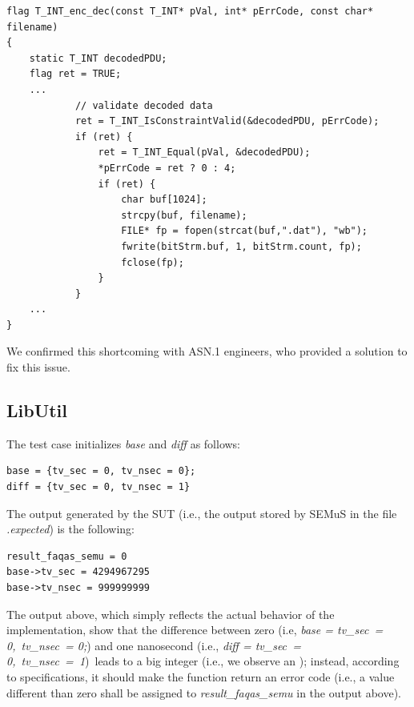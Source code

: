 \begin{lstlisting}[style=CStyle, caption=ASN.1 test code., label=test_code]
flag T_INT_enc_dec(const T_INT* pVal, int* pErrCode, const char* filename)
{
    static T_INT decodedPDU;
    flag ret = TRUE;
    ...
            // validate decoded data
            ret = T_INT_IsConstraintValid(&decodedPDU, pErrCode); 
            if (ret) {
                ret = T_INT_Equal(pVal, &decodedPDU);
                *pErrCode = ret ? 0 : 4;
                if (ret) {
                    char buf[1024];
                    strcpy(buf, filename);
                    FILE* fp = fopen(strcat(buf,".dat"), "wb");
                    fwrite(bitStrm.buf, 1, bitStrm.count, fp);
                    fclose(fp);
                }
            }
    ...
}
\end{lstlisting}

We confirmed this shortcoming with ASN.1 engineers, who provided a solution to fix this issue.

\subsection{LibUtil}




\STARTCHANGEDFINAL

The test case initializes \emph{base} and \emph{diff} as follows:
\begin{verbatim}
base = {tv_sec = 0, tv_nsec = 0};
diff = {tv_sec = 0, tv_nsec = 1} 
\end{verbatim}

The output generated by the SUT (i.e., the output stored by SEMuS in the file \emph{.expected}) is the following:
\begin{verbatim}
result_faqas_semu = 0
base->tv_sec = 4294967295
base->tv_nsec = 999999999
\end{verbatim}

The output above, which simply reflects the actual behavior of the implementation, show that the difference between zero (i.e, \emph{base = {tv\_sec = 0, tv\_nsec = 0};}) and one nanosecond  (i.e., \emph{diff = {tv\_sec = 0, tv\_nsec = 1}}) leads to a big integer (i.e., we observe an ); instead, according to specifications, it should make the function return an error code (i.e., a value different than zero shall be assigned to \emph{result\_faqas\_semu} in the output above).


